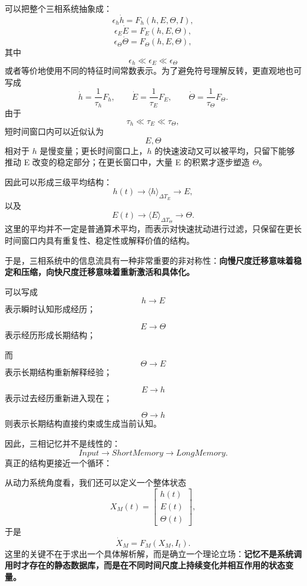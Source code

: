 可以把整个三相系统抽象成：
\[
\epsilon_h\dot h
=
F_h(h,E,\Theta,I),
\]
\[
\epsilon_E\dot E
=
F_E(h,E,\Theta),
\]
\[
\epsilon_\Theta\dot\Theta
=
F_\Theta(h,E,\Theta),
\]
其中
\[
\epsilon_h
\ll
\epsilon_E
\ll
\epsilon_\Theta
\]
或者等价地使用不同的特征时间常数表示。为了避免符号理解反转，更直观地也可写成
\[
\dot h
=
\frac{1}{\tau_h}F_h,
\qquad
\dot E
=
\frac{1}{\tau_E}F_E,
\qquad
\dot\Theta
=
\frac{1}{\tau_\Theta}F_\Theta.
\]
由于
\[
\tau_h\ll\tau_E\ll\tau_\Theta,
\]
短时间窗口内可以近似认为
\[
E,\Theta
\]
相对于 $h$ 是慢变量；更长时间窗口上，$h$ 的快速波动又可以被平均，只留下能够推动 E 改变的稳定部分；在更长窗口中，大量 E 的积累才逐步塑造 $\Theta$。

因此可以形成三级平均结构：
\[
h(t)
\rightarrow
\langle h\rangle_{\Delta T_E}
\rightarrow
E,
\]
以及
\[
E(t)
\rightarrow
\langle E\rangle_{\Delta T_\Theta}
\rightarrow
\Theta.
\]
这里的平均并不一定是普通算术平均，而表示对快速扰动进行过滤，只保留在更长时间窗口内具有重复性、稳定性或解释价值的结构。

于是，三相系统中的信息流具有一种非常重要的非对称性：\textbf{向慢尺度迁移意味着稳定和压缩，向快尺度迁移意味着重新激活和具体化。}

可以写成
\[
h\rightarrow E
\]
表示瞬时认知形成经历；

\[
E\rightarrow\Theta
\]
表示经历形成长期结构；

而
\[
\Theta\rightarrow E
\]
表示长期结构重新解释经验；

\[
E\rightarrow h
\]
表示过去经历重新进入现在；

\[
\Theta\rightarrow h
\]
则表示长期结构直接约束或生成当前认知。

因此，三相记忆并不是线性的：
\[
Input\to ShortMemory\to LongMemory.
\]
真正的结构更接近一个循环：
\begin{statementbox}
\centering
{}
\end{statementbox}

从动力系统角度看，我们还可以定义一个整体状态
\[
X_M(t)
=
\begin{bmatrix}
h(t)\\
E(t)\\
\Theta(t)
\end{bmatrix},
\]
于是
\[
\dot X_M
=
F_M
\left(
X_M,I_t
\right).
\]
这里的关键不在于求出一个具体解析解，而是确立一个理论立场：\textbf{记忆不是系统调用时才存在的静态数据库，而是在不同时间尺度上持续变化并相互作用的状态变量。}

